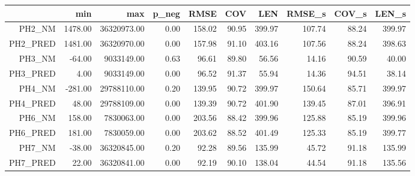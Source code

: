 \begin{table}[ht]
\centering
\begin{tabular}{rrrrrrrrrr}
  \toprule
 & min & max & p\_neg & RMSE & COV & LEN & RMSE\_s & COV\_s & LEN\_s \\ 
  \midrule
PH2\_NM & 1478.00 & 36320973.00 & 0.00 & 158.02 & 90.95 & 399.97 & 107.74 & 88.24 & 399.97 \\ 
  PH2\_PRED & 1481.00 & 36320970.00 & 0.00 & 157.98 & 91.10 & 403.16 & 107.56 & 88.24 & 398.63 \\ 
  PH3\_NM & -64.00 & 9033149.00 & 0.63 & 96.61 & 89.80 & 56.56 & 14.16 & 90.59 & 40.00 \\ 
  PH3\_PRED & 4.00 & 9033149.00 & 0.00 & 96.52 & 91.37 & 55.94 & 14.36 & 94.51 & 38.14 \\ 
  PH4\_NM & -281.00 & 29788110.00 & 0.20 & 139.95 & 90.72 & 399.97 & 150.64 & 85.71 & 399.97 \\ 
  PH4\_PRED & 48.00 & 29788109.00 & 0.00 & 139.39 & 90.72 & 401.90 & 139.45 & 87.01 & 396.91 \\ 
  PH6\_NM & 158.00 & 7830063.00 & 0.00 & 203.56 & 88.42 & 399.96 & 125.88 & 85.19 & 399.96 \\ 
  PH6\_PRED & 181.00 & 7830059.00 & 0.00 & 203.62 & 88.52 & 401.49 & 125.33 & 85.19 & 399.77 \\ 
  PH7\_NM & -38.00 & 36320845.00 & 0.20 & 92.28 & 89.56 & 135.99 & 45.72 & 91.18 & 135.99 \\ 
  PH7\_PRED & 22.00 & 36320841.00 & 0.00 & 92.19 & 90.10 & 138.04 & 44.54 & 91.18 & 135.56 \\ 
   \bottomrule
\end{tabular}
\end{table}
